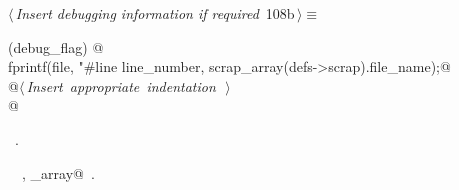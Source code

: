 \documentclass[a4paper]{report}
\begin{document}
\begin{flushleft} \small
\begin{minipage}{\linewidth}\label{scrap226}\raggedright\small
{} $\langle\,${\it Insert debugging information if required}\nobreak\ {\footnotesize {108b}}$\,\rangle\equiv$
\vspace{-1ex}
\begin{list}{}{} \item
\mbox{}\verb@if (debug_flag) {@\\
\mbox{}\verb@  fprintf(file, "\n#line %d \"%s\"\n",@\\
\mbox{}\verb@          line_number, scrap_array(defs->scrap).file_name);@\\
\mbox{}\verb@  @\hbox{$\langle\,${\it Insert appropriate indentation}\nobreak\ {\footnotesize {}}$\,\rangle$}\verb@@\\
\mbox{}\verb@}@{\NWsep}
\end{list}
\vspace{-1.5ex}
\footnotesize
\begin{list}{}{\setlength{\itemsep}{-\parsep}\setlength{\itemindent}{-\leftmargin}}
\item \NWtxtMacroRefIn\ .
\item \NWtxtIdentsUsed\nobreak\  \verb@fprintf@\nobreak\ , \verb@scrap_array@\nobreak\ .
\item{}
\end{list}
\end{minipage}\vspace{4ex}
\end{flushleft}
\end{document}
